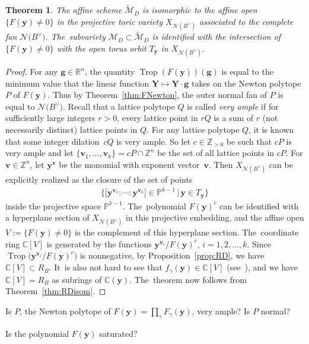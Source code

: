 \documentclass[pdftex]{sigma}%
\def\R{{\mathbb R}}
\def\C{{\mathbb C}}
\def\Z{{\mathbb Z}}
\def\M{{\mathcal{M}}}
\def\tM{{\widetilde {\mathcal{M}}}}
\def\y{{\mathbf y}}
\def\v{{\mathbf v}}
\def\N{{\mathcal{N}}}
\def\Trop{\operatorname{Trop}}
\def\g{{\mathbf g}}
\def\Y{{\mathbf Y}}
\renewcommand{\P}{{\mathbb P}}
\numberwithin{equation}{section}
\newtheorem{Theorem}{Theorem}[section]
\begin{document}
\begin{Theorem}\label{thm:toric}
The affine scheme $\tM_D$ is isomorphic to the affine open $\{F(\y) \neq 0\}$ in the projective toric variety $X_{\N(B^\vee)}$ associated to the complete fan $\N\big(B^\vee\big)$. The~subvariety \mbox{$\M_D \subset \tM_D$} is identified with the intersection of $\{F(\y) \neq 0\}$ with the open torus orbit $T_\y$ in $X_{\N(B^\vee)}$.
\end{Theorem}
\begin{proof}
For any $\g \in \R^n$, the quantity $\Trop(F(\y))(\g)$ is equal to the minimum value that the linear function $\Y \mapsto \Y \cdot \g$ takes on the Newton polytope $P$ of $F(\y)$. Thus by Theorem~\ref{thm:FNewton}, the outer normal fan of $P$ is equal to $\N\big(B^\vee\big)$. Recall that a lattice polytope $Q$ is called \emph{very ample} if for sufficiently large integers $r>0$, every lattice point in $rQ$ is a sum
of $r$ (not necessarily distinct) lattice points in $Q$. For any lattice polytope $Q$, it is known that some integer dilation~$cQ$ is very ample. So let $c \in \Z_{>0}$ be such that $cP$ is very ample and let $\{\v_1,\dots,\v_k\} = cP \cap \Z^n$ be the set of all lattice points in $cP$. For $\v \in \Z^n$, let $\y^\v$ be the monomial with exponent vector~$\v$. Then $X_{\N(B^\vee)}$ can be explicitly realized as the closure of the set of points
\begin{gather*}
\Big\{\big[\y^{\v_1}:\cdots: \y^{\v_k}\big] \in \P^{k-1} \,|\, \y \in T_\y \Big\}
\end{gather*}
inside the projective space $\P^{k-1}$. The~polynomial $F(\y)^c$ can be identified with a hyperplane section of $X_{\N(B^\vee)}$ in this projective embedding, and the affine open $V:=\{F(\y) \neq 0\}$ is the complement of this hyperplane section. The~coordinate ring $\C[V]$ is generated by the functions $\y^{\v_i}/F(\y)^c$, $i =1,2,\dots,k$. Since $\Trop\big(\y^{\v_i}/F(\y)^c\big)$ is nonnegative, by Proposition~\ref{prop:RD}, we have $\C[V] \subset R_B$. It~is also not hard to see that $f_\gamma(\y) \in \C[V]$ (see~\cite[Section~10]{AHL}), and we have $\C[V] = R_B$ as subrings of $\C(\y)$. The~theorem now follows from Theorem~\ref{thm:RDisom}.
\end{proof}

\begin{question}
Is $P$, the Newton polytope of $F(\y) = \prod_\gamma F_\gamma(\y)$, very ample? Is $P$ normal?
\end{question}

\begin{question}\label{q:sat}
Is the polynomial $F(\y)$ saturated?
\end{question}
\end{document}
